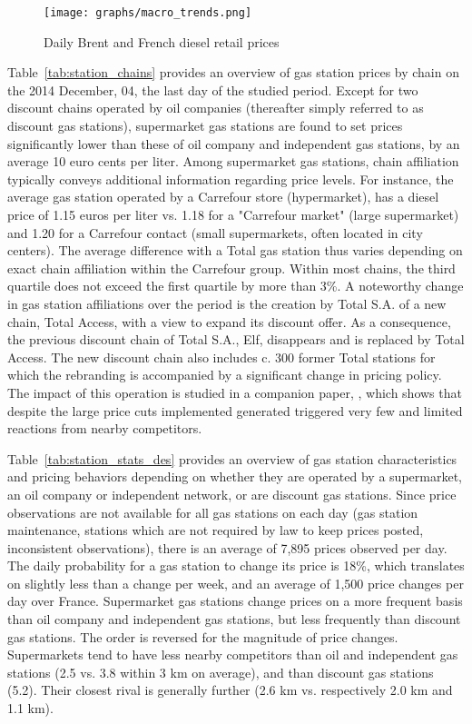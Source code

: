 \documentclass[english]{article}
\begin{document}
\begin{figure}[htb!]
    \caption{Daily Brent and French diesel retail prices}
	\centering
		\texttt{[image: graphs/macro\_trends.png]}
\label{fig:brent_and_diesel}
\end{figure}

Table~\ref{tab:station_chains} provides an overview of gas station prices by chain on the 2014 December, 04, the last day of the studied period. Except for two discount chains operated by oil companies (thereafter simply referred to as discount gas stations), supermarket gas stations are found to set prices significantly lower than these of oil company and independent gas stations, by an average 10 euro cents per liter. Among supermarket gas stations, chain affiliation typically conveys additional information regarding price levels. For instance, the average gas station operated by a Carrefour store (hypermarket), has a diesel price of 1.15 euros per liter vs. 1.18 for a "Carrefour market" (large supermarket) and 1.20 for a Carrefour contact (small supermarkets, often located in city centers). The average difference with a Total gas station thus varies depending on exact chain affiliation within the Carrefour group. Within most chains, the third quartile does not exceed the first quartile by more than 3\%. A noteworthy change in gas station affiliations over the period is the creation by Total S.A. of a new chain, Total Access, with a view to expand its discount offer. As a consequence, the previous discount chain of Total S.A., Elf, disappears and is replaced by Total Access. The new discount chain also includes c. 300 former Total stations for which the rebranding is accompanied by a significant change in pricing policy. The impact of this operation is studied in a companion paper, \cite{CHA16}, which shows that despite the large price cuts implemented generated triggered very few and limited reactions from nearby competitors.

Table~\ref{tab:station_stats_des} provides an overview of gas station characteristics and pricing behaviors depending on whether they are operated by a supermarket, an oil company or independent network, or are discount gas stations. Since price observations are not available for all gas stations on each day (gas station maintenance, stations which are not required by law to keep prices posted, inconsistent observations), there is an average of 7,895 prices observed per day. The daily probability for a gas station to change its price is 18\%, which translates on slightly less than a change per week, and an average of 1,500 price changes per day over France. Supermarket gas stations change prices on a more frequent basis than oil company and independent gas stations, but less frequently than discount gas stations. The order is reversed for the magnitude of price changes. Supermarkets tend to have less nearby competitors than oil and independent gas stations (2.5 vs. 3.8 within 3 km on average), and than discount gas stations (5.2). Their closest rival is generally further (2.6 km vs. respectively 2.0 km and 1.1 km).
\end{document}
